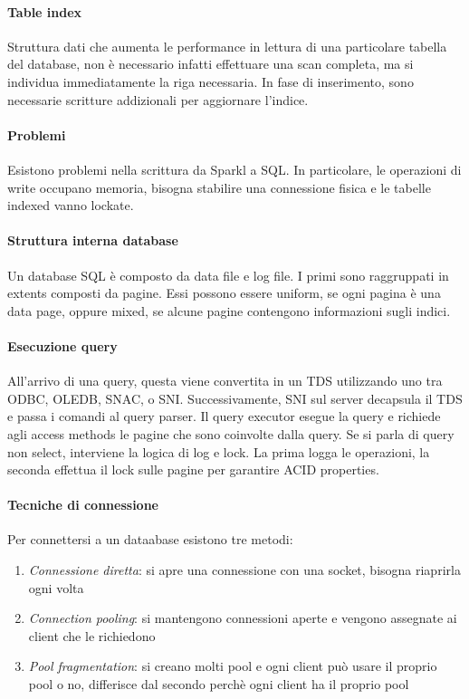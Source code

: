\paragraph{Table index}
Struttura dati che aumenta le performance in lettura di una particolare tabella del 
database, non è necessario infatti effettuare una scan completa, ma si individua 
immediatamente la riga necessaria.
In fase di inserimento, sono necessarie scritture addizionali per aggiornare l'indice.

\paragraph{Problemi}
Esistono problemi nella scrittura da Sparkl a SQL. In particolare, le operazioni di 
write occupano memoria, bisogna stabilire una connessione fisica e le tabelle indexed 
vanno lockate.

\paragraph{Struttura interna database}
Un database SQL è composto da data file e log file. I primi sono raggruppati in extents 
composti da pagine. Essi possono essere uniform, se ogni pagina è una data page, oppure 
mixed, se alcune pagine contengono informazioni sugli indici.

\paragraph{Esecuzione query}
All'arrivo di una query, questa viene convertita in un TDS utilizzando uno tra ODBC, 
OLEDB, SNAC, o SNI.
Successivamente, SNI sul server decapsula il TDS e passa i comandi al query parser.
Il query executor esegue la query e richiede agli access methods le pagine che sono 
coinvolte dalla query. Se si parla di query non select, interviene la logica di log e lock.
La prima logga le operazioni, la seconda effettua il lock sulle pagine per garantire ACID properties.

\paragraph{Tecniche di connessione}
Per connettersi a un dataabase esistono tre metodi:
\begin{enumerate}
    \item \emph{Connessione diretta}: si apre una connessione con una socket, bisogna 
    riaprirla ogni volta
    \item \emph{Connection pooling}: si mantengono connessioni aperte e vengono assegnate 
    ai client che le richiedono
    \item \emph{Pool fragmentation}: si creano molti pool e ogni client può usare il proprio
     pool o no, differisce dal secondo perchè ogni client ha il proprio pool
\end{enumerate}

